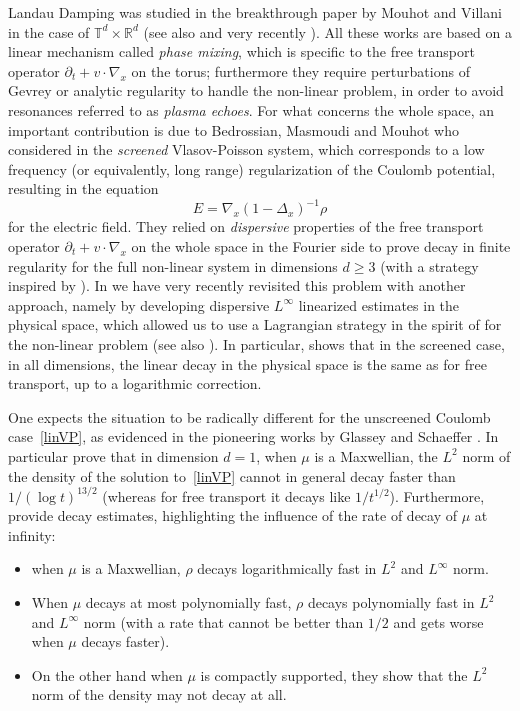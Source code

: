 \documentclass[11pt]{amsart}
\newcommand{\pa}{\partial}
\numberwithin{equation}{section}
\newcommand{\R}{\mathbb{R}}
\newcommand{\T}{\mathbb{T}}
\newcommand{\na}{\nabla}
\begin{document}
Landau Damping was studied in the breakthrough paper \cite{MV} by Mouhot and Villani in the case of $\T^d \times \R^d$ (see also \cite{BMM1} and very recently \cite{GNR}). All these works are based on a linear mechanism called \emph{phase mixing}, which is specific to the free transport operator $
\pa_t + v \cdot \na_x
$ on the torus; furthermore they require perturbations of Gevrey or analytic regularity to handle the non-linear problem, in order to avoid resonances referred to as \emph{plasma echoes}.
For what concerns the whole space,  an important contribution is due to Bedrossian, Masmoudi and Mouhot who  considered in \cite{BMM2} the \emph{screened} Vlasov-Poisson system, which corresponds to a low frequency (or equivalently, long range) regularization of the Coulomb potential, resulting in the equation
$$
E = \nabla_x   (1-\Delta_x)^{-1} \rho
$$
for the electric field. They relied on \emph{dispersive} properties of the free transport operator
$
\pa_t + v \cdot \na_x
$
on the whole space in the Fourier side 
 to prove decay in finite regularity for the full non-linear system in dimensions $d\geq 3$ (with a strategy inspired by \cite{MV,BMM1}).
In \cite{HNR} we have very  recently revisited this problem with another approach, namely by developing dispersive $L^\infty$ linearized estimates in the physical space, which allowed us to use a  Lagrangian strategy in the spirit of \cite{BD} for the non-linear problem (see also \cite{Trinh}). In particular, \cite{HNR} shows that in the screened case, in all dimensions, the linear decay
 in the physical space is the same as for free transport, up to a logarithmic correction.

One expects the situation to be radically different for the unscreened Coulomb case~\eqref{linVP}, as evidenced in the pioneering works by Glassey and Schaeffer \cite{GS1,GS2}. In particular \cite{GS1,GS2} prove that in dimension $d=1$, when $\mu$ is a Maxwellian, the $L^2$ norm of the density of the solution to~\eqref{linVP} cannot in general decay faster than $1/ (\log t)^{13/2}$ (whereas for free transport it decays like $1/t^{1/2}$).
Furthermore, \cite{GS1,GS2} provide decay estimates, highlighting the influence of the rate of decay of $\mu$ at infinity:
\begin{itemize}

\item when $\mu$ is a Maxwellian, $\rho$ decays logarithmically fast in $L^2$ and $L^\infty$ norm.

\item When $\mu$ decays at most polynomially fast, $\rho$ decays polynomially fast in $L^2$ and $L^\infty$ norm (with a rate that cannot be better than $1/2$ and gets worse  when $\mu$ decays faster).

\item On the other hand when $\mu$ is compactly supported, they show that the $L^2$ norm of the density may not decay at all.

\end{itemize}
\end{document}
